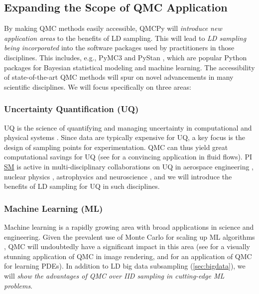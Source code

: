 \documentclass[11pt]{NSFamsart}
\newcommand{\cmtS}[1]{{\color{blue}{(Simon: #1)}}}
\newcommand{\SM}{\hyperlink{SMlink}{SM}\xspace}
\begin{document}
\subsection{Expanding the Scope of QMC Application} \label{sec:scopeapplication} \cmtS{will revise, make more focused on specific scientific applications} By making QMC methods easily accessible, QMCPy will \emph{introduce new application areas} to the benefits of LD sampling.  This will lead to \emph{LD sampling being incorporated} into the software packages used by practitioners in those disciplines. This includes, e.g., PyMC3 \citep{salvatier2016probabilistic} and PyStan \citep{stan2017pystan}, which are popular Python packages for Bayesian statistical modeling and machine learning. The accessibility of state-of-the-art QMC methods will spur on novel advancements in many scientific disciplines. We will focus specifically on three areas:
\subsubsection{Uncertainty Quantification (UQ)} UQ is the science of quantifying and managing uncertainty in computational and physical systems \cite{smartuq, Smi14a}. Since data are typically expensive for UQ, a key focus is the design of sampling points for experimentation. QMC can thus yield great computational savings for UQ (see \cite{HerSch20a} for a convincing application in fluid flows). PI \SM is active in multi-disciplinary collaborations on UQ in aerospace engineering \cite{li2017two,li2018uncertainty,chang2019kernel,yeh2018common,mak2018efficient}, nuclear physics \cite{ji2021graphical,everett2021multisystem,everett2021phenomenological,cao2021determining}, astrophysics \citep{mak2018maximum,zheng2021online,makinformation} and neuroscience \cite{wang2020uncertainty,wang2021sequential}, and we will introduce the benefits of LD sampling for UQ in such disciplines.
\subsubsection{Machine Learning (ML)} Machine learning is a rapidly growing area with broad applications in science and engineering. Given the prevalent use of Monte Carlo for scaling up ML algorithms \cite{Bot2010,friedman2002stochastic,quiroz2018speeding}, QMC will undoubtedly have a significant impact in this area (see \cite{Keller2013a} for a visually stunning application of QMC in image rendering, and \cite{chen2019quasi} for an application of QMC for learning PDEs). In addition to LD big data subsampling (\cref{sec:bigdata}), we will \textit{show the advantages of QMC over IID sampling in cutting-edge ML problems}.
\end{document}

